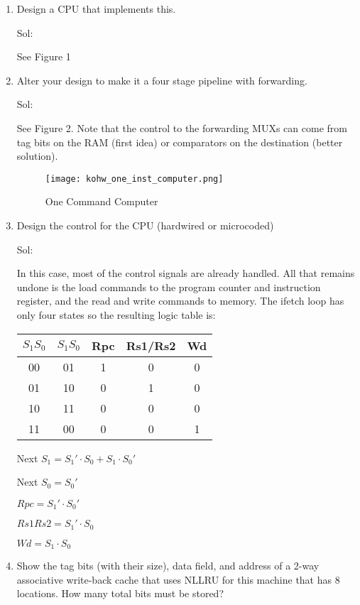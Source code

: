 \begin{enumerate}
    \item Design a CPU that implements this.

    {\color{ans}
    Sol:

    See Figure 1
    }

    \item Alter your design to make it a four stage pipeline with forwarding.

    {\color{ans}
    Sol:

    See Figure 2.  Note that the control to the forwarding MUXs can come from tag bits on the RAM (first idea) or comparators on the destination (better solution).
    }


\begin{figure}[h]
  \texttt{[image: kohw\_one\_inst\_computer.png]}
  \caption{One Command Computer}\label{f-1command}
\end{figure}


    \item Design the control for the CPU (hardwired or microcoded)

    {\color{ans}
    Sol:

    In this case, most of the control signals are already handled.  All that remains undone is the load commands to the program counter and instruction register, and the read and write commands to memory.  The ifetch loop has only four states so the resulting logic table is:

\begin{tabular}{c||c|c|c|c}
$S_1 S_0$ & $S_1 S_0$ & Rpc & Rs1/Rs2 & Wd \\ \hline
00        & 01        & 1   & 0       & 0  \\
01        & 10        & 0   & 1       & 0  \\
10        & 11        & 0   & 0       & 0  \\
11        & 00        & 0   & 0       & 1  \\
\end{tabular}

Next $S_1 = S_1'\cdot S_0 + S_1\cdot S_0'$

Next $S_0 = S_0'$

$Rpc = S_1'\cdot S_0'$

$Rs1Rs2 = S_1'\cdot S_0$

$Wd = S_1\cdot S_0$
    }

    \item Show the tag bits (with their size), data field, and address of a 2-way associative write-back cache that uses NLLRU for this machine that has 8 locations.  How many total bits must be stored?


\end{enumerate}
